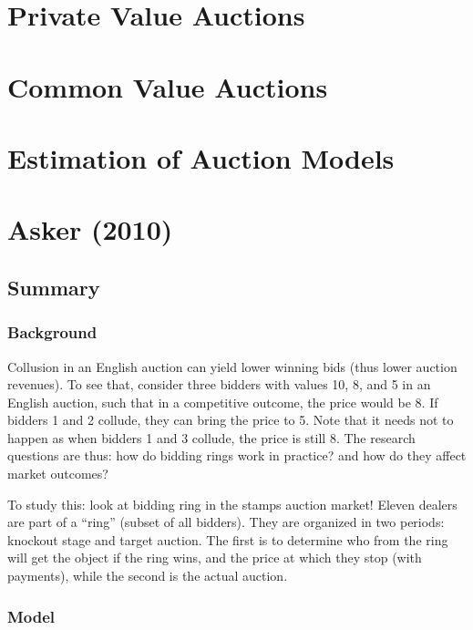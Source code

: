 \section{Private Value Auctions}



\section{Common Value Auctions}



\section{Estimation of Auction Models}



\section{Asker (2010)}

\subsection{Summary}

\subsubsection{Background}

Collusion in an English auction can yield lower winning bids (thus lower auction revenues). To see that, consider three bidders with values 10, 8, and 5 in an English auction, such that in a competitive outcome, the price would be 8. If bidders 1 and 2 collude, they can bring the price to 5.  Note that it needs not to happen as when bidders 1 and 3 collude, the price is still 8. The research questions are thus: how do bidding rings work in practice? and how do they affect market outcomes?

To study this: look at bidding ring in the stamps auction market! Eleven dealers are part of a ``ring'' (subset of all bidders). They are organized in two periods: knockout stage and target auction. The first is to determine who from the ring will get the object if the ring wins, and the price at which they stop (with payments), while the second is the actual auction.

\subsubsection{Model}

